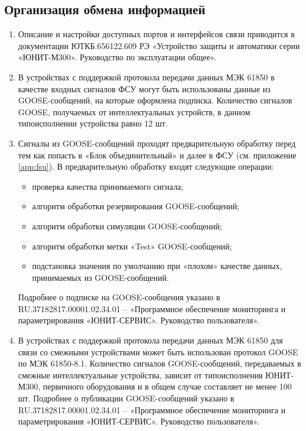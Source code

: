 \color{unimain}\subsection{Организация обмена информацией}\color{black}

\begin{enumerate}

\item\sloppy Описание и настройки доступных портов и интерфейсов связи приводится в документации ЮТКБ.656122.609 РЭ «Устройство защиты и автоматики серии «ЮНИТ-М300». Руководство по эксплуатации общее».

\item
В устройствах с поддержкой протокола передачи данных МЭК 61850 в качестве входных сигналов ФСУ могут быть использованы данные из GOOSE-сообщений, на которые оформлена подписка. Количество сигналов GOOSE, получаемых от интеллектуальных устройств, в данном типоисполнении устройства равно 12 шт.
\item
Сигналы из GOOSE-сообщений проходят предварительную обработку перед тем как попасть в «Блок объединительный» и далее в ФСУ (см. приложение \ref{app:fsu}).
В предварительную обработку входят следующие операции:
\begin{itemize}
\item проверка качества принимаемого сигнала;
\item алгоритм обработки резервирования GOOSE-сообщений;
\item алгоритм обработки симуляции GOOSE-сообщений;
\item алгоритм обработки метки «Test» GOOSE-сообщений;
\item подстановка значения по умолчанию при «плохом» качестве данных, принимаемых из GOOSE-сообщений.
\end{itemize}
Подробнее о подписке на GOOSE-сообщения указано в RU.37182817.00001.02.34.01 – «Программное обеспечение мониторинга и параметрирования «ЮНИТ-СЕРВИС». Руководство пользователя».

\item 
В устройствах с поддержкой протокола передачи данных МЭК 61850 для связи со смежными устройствами может быть использован протокол GOOSE по МЭК 61850-8.1. Количество сигналов GOOSE-сообщений, передаваемых в смежные интеллектуальные устройства, зависит от типоисполнения ЮНИТ-М300, первичного оборудования и в общем случае составляет не менее 100 шт. Подробнее о публикации GOOSE-сообщений указано в RU.37182817.00001.02.34.01 – «Программное обеспечение мониторинга и параметрирования «ЮНИТ-СЕРВИС». Руководство пользователя».

\end{enumerate}

